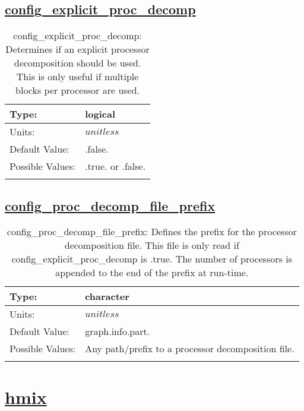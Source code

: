 \subsection[config\_explicit\_proc\_decomp]{\hyperref[sec:nm_tab_decomposition]{config\_explicit\_proc\_decomp}}
\label{subsec:nm_sec_config_explicit_proc_decomp}
\begin{center}
\begin{longtable}{| p{2.0in} | p{4.0in} |}
    \hline
    Type: & logical \\
    \hline
    Units: & $unitless$ \\
    \hline
    Default Value: & .false. \\
    \hline
    Possible Values: & .true. or .false. \\
    \hline
    \caption{config\_explicit\_proc\_decomp: Determines if an explicit processor decomposition should be used. This is only useful if multiple blocks per processor are used.}
\end{longtable}
\end{center}
\subsection[config\_proc\_decomp\_file\_prefix]{\hyperref[sec:nm_tab_decomposition]{config\_proc\_decomp\_file\_prefix}}
\label{subsec:nm_sec_config_proc_decomp_file_prefix}
\begin{center}
\begin{longtable}{| p{2.0in} | p{4.0in} |}
    \hline
    Type: & character \\
    \hline
    Units: & $unitless$ \\
    \hline
    Default Value: & graph.info.part. \\
    \hline
    Possible Values: & Any path/prefix to a processor decomposition file. \\
    \hline
    \caption{config\_proc\_decomp\_file\_prefix: Defines the prefix for the processor decomposition file. This file is only read if config\_explicit\_proc\_decomp is .true. The number of processors is appended to the end of the prefix at run-time.}
\end{longtable}
\end{center}
\section[hmix]{\hyperref[sec:nm_tab_hmix]{hmix}}
\label{sec:nm_sec_hmix}
